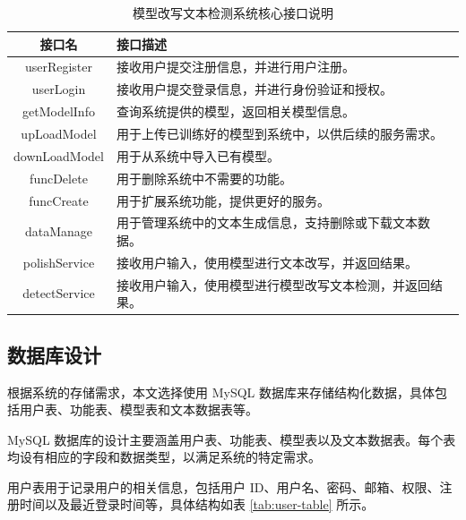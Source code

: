\begin{table}[htb]
    \centering
    \caption{模型改写文本检测系统核心接口说明}
    \label{tab:sys-interfaces}
    \begin{tabular}{cl}
        \toprule
        接口名 & 接口描述 \\
        \midrule
        userRegister & 接收用户提交注册信息，并进行用户注册。 \\
        userLogin & 接收用户提交登录信息，并进行身份验证和授权。 \\
        getModelInfo & 查询系统提供的模型，返回相关模型信息。 \\
        upLoadModel & 用于上传已训练好的模型到系统中，以供后续的服务需求。 \\
        downLoadModel & 用于从系统中导入已有模型。 \\
        funcDelete & 用于删除系统中不需要的功能。 \\
        funcCreate & 用于扩展系统功能，提供更好的服务。 \\
        dataManage & 用于管理系统中的文本生成信息，支持删除或下载文本数据。 \\
        polishService & 接收用户输入，使用模型进行文本改写，并返回结果。 \\
        detectService & 接收用户输入，使用模型进行模型改写文本检测，并返回结果。 \\
        \bottomrule
    \end{tabular}
\end{table}

\subsection{数据库设计}
\label{sec:sys-db}

根据系统的存储需求，本文选择使用 MySQL 数据库来存储结构化数据，具体包括用户表、功能表、模型表和文本数据表等。

MySQL 数据库的设计主要涵盖用户表、功能表、模型表以及文本数据表。每个表均设有相应的字段和数据类型，以满足系统的特定需求。

用户表用于记录用户的相关信息，包括用户 ID、用户名、密码、邮箱、权限、注册时间以及最近登录时间等，具体结构如表 \ref{tab:user-table} 所示。

